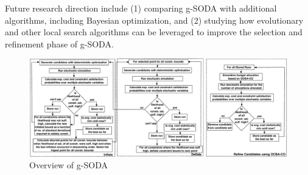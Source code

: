 \documentclass[a4paper, 12pt]{article} %
\begin{document}
Future research direction include (1) comparing g-SODA with additional algorithms, including Bayesian optimization, and (2) studying how evolutionary and other local search algorithms can be leveraged to improve the selection and refinement phase of g-SODA.


 


\begin{figure}[h!]
	\includegraphics[width=\textwidth]{images/Algo_Full.pdf}
	\caption{Overview of g-SODA}
	\label{fig:algoOverview}       %
\end{figure}
\end{document}
